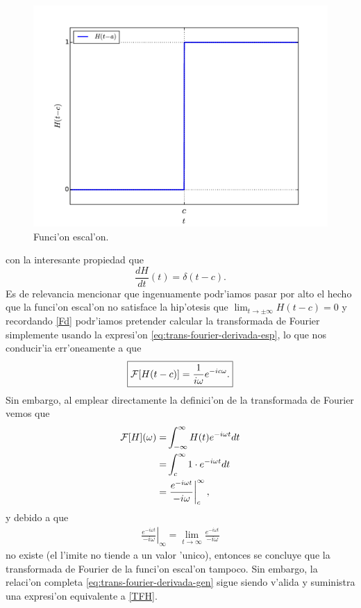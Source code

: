 \begin{figure}[h]
\centering
\includegraphics[scale=0.4]{figs/fig-funcion-escalon.pdf}
\caption{Funci'on escal'on.}
\label{im:escalon}
\end{figure}
con la interesante propiedad que
\begin{equation}
\frac{dH}{dt}(t) = \delta(t-c).
\end{equation}
Es de relevancia mencionar que ingenuamente podr'iamos pasar por alto el hecho que la funci'on escal'on no satisface la hip'otesis que $\lim_{t\to\pm\infty}H(t-c)=0$ y recordando \eqref{Fd} podr'iamos pretender calcular la transformada de Fourier simplemente usando la expresi'on \eqref{eq:trans-fourier-derivada-esp}, lo que nos conducir'ia err'oneamente a que
\begin{equation}
\boxed{ {\cal F}[H(t-c)] =\frac{1}{i\omega} e^{-i c\omega}.}
\end{equation}
Sin embargo, al emplear directamente la definici'on de la transformada de Fourier vemos que
\begin{align}
{\cal F}[H](\omega)=&\int_{-\infty}^{\infty}H(t)e^{-i\omega t}dt\notag \\
=&\int_{c}^{\infty}1\cdot e^{-i\omega t}dt\notag \\
=&\left.\frac{e^{-i\omega t}}{-i\omega}\right|_{c}^{\infty}, \label{TFH}
\end{align}
y debido a que
\begin{align}
\left.\frac{e^{-i\omega t}}{-i\omega}\right|_{\infty}=\lim_{t \rightarrow \infty}\frac{e^{-i\omega t}}{-i\omega}
\end{align}
no existe (el l'imite no tiende a un valor 'unico), entonces se concluye que la transformada de Fourier de la funci'on escal'on tampoco. Sin embargo, la relaci'on  completa \eqref{eq:trans-fourier-derivada-gen} sigue siendo v'alida y suministra una expresi'on equivalente a \eqref{TFH}.
%
